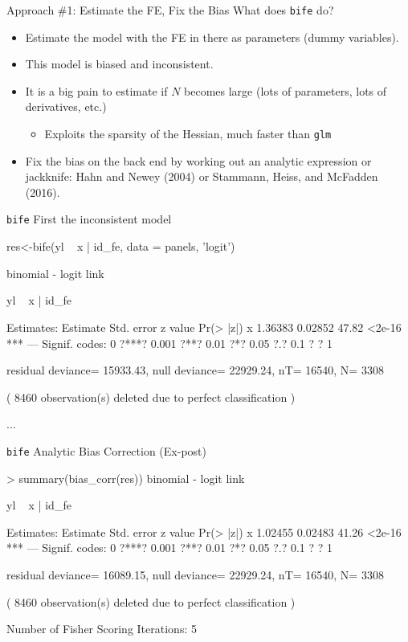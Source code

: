 \documentclass[xcolor=pdftex,dvipsnames,table,mathserif,aspectratio=169]{beamer}
\begin{document}
\begin{frame}{Approach \#1: Estimate the FE, Fix the Bias }
What does \texttt{bife} do?
\begin{itemize}
\item Estimate the model with the FE in there as parameters (dummy variables).
\item This model is \alert{biased} and \alert{inconsistent}.
\item It is a big pain to estimate if $N$ becomes large (lots of parameters, lots of derivatives, etc.)
\begin{itemize}
\item Exploits the \alert{sparsity} of the Hessian, much faster than \texttt{glm}
\end{itemize}
\item Fix the bias on the back end by working out an analytic expression or jackknife: Hahn and Newey (2004) or Stammann,  Heiss, and McFadden (2016).
\end{itemize}
\end{frame}

\begin{frame}[fragile]{\texttt{bife} First the inconsistent model}
\scriptsize
\begin{semiverbatim}
res<-bife(yl ~ x | id_fe, data = panels, 'logit')

binomial - logit link

yl ~ x | id_fe

Estimates:
  Estimate Std. error z value Pr(> |z|)    
x  \alert{1.36383}    0.02852   47.82    <2e-16 ***
---
Signif. codes:  0 ?***? 0.001 ?**? 0.01 ?*? 0.05 ?.? 0.1 ? ? 1

residual deviance= 15933.43,
null deviance= 22929.24,
nT= 16540, N= 3308

( 8460 observation(s) deleted due to perfect classification )

...
\end{semiverbatim}
\end{frame}


\begin{frame}[fragile]{\texttt{bife} Analytic Bias Correction (Ex-post)}
\scriptsize
\begin{semiverbatim}
> summary(bias_corr(res))
binomial - logit link

yl ~ x | id_fe

Estimates:
  Estimate Std. error z value Pr(> |z|)    
x  \alert{1.02455}    0.02483   41.26    <2e-16 ***
---
Signif. codes:  0 ?***? 0.001 ?**? 0.01 ?*? 0.05 ?.? 0.1 ? ? 1

residual deviance= 16089.15,
null deviance= 22929.24,
nT= 16540, N= 3308

( 8460 observation(s) deleted due to perfect classification )

Number of Fisher Scoring Iterations: 5 


\end{semiverbatim}
\end{frame}
\end{document}
